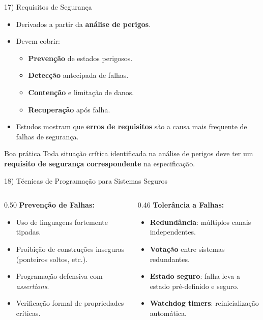 \documentclass[aspectratio=169]{beamer}
\begin{document}
\begin{frame}{17) Requisitos de Segurança}
  \begin{itemize}
    \item Derivados a partir da \textbf{análise de perigos}.
    \item Devem cobrir:
    \begin{itemize}
      \item \textbf{Prevenção} de estados perigosos.
      \item \textbf{Detecção} antecipada de falhas.
      \item \textbf{Contenção} e limitação de danos.
      \item \textbf{Recuperação} após falha.
    \end{itemize}
    \item Estudos mostram que \textbf{erros de requisitos} são a causa mais frequente de falhas de segurança.
  \end{itemize}
  \vspace{0.3em}
  \begin{exampleblock}{Boa prática}
    Toda situação crítica identificada na análise de perigos deve ter um \textbf{requisito de segurança correspondente} na especificação.
  \end{exampleblock}
\end{frame}

\begin{frame}{18) Técnicas de Programação para Sistemas Seguros}
  \begin{columns}
    \begin{column}{0.50\textwidth}
      \textbf{Prevenção de Falhas:}
      \begin{itemize}
        \item Uso de linguagens fortemente tipadas.
        \item Proibição de construções inseguras (ponteiros soltos, etc.).
        \item Programação defensiva com \textit{assertions}.
        \item Verificação formal de propriedades críticas.
      \end{itemize}
    \end{column}
    \begin{column}{0.46\textwidth}
      \textbf{Tolerância a Falhas:}
      \begin{itemize}
        \item \textbf{Redundância}: múltiplos canais independentes.
        \item \textbf{Votação} entre sistemas redundantes.
        \item \textbf{Estado seguro}: falha leva a estado pré-definido e seguro.
        \item \textbf{Watchdog timers}: reinicialização automática.
      \end{itemize}
    \end{column}
  \end{columns}
\end{frame}
\end{document}
